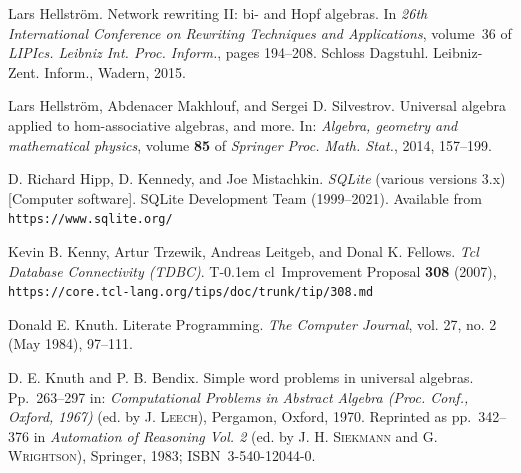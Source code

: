 \documentclass{article}
\theoremstyle{definition}
\newcommand{\Tcl}{T\kern-0.1em cl}
\providecommand{\url}[1]{\texttt{#1}}
\begin{document}
\begin{thebibliography}{99}
   Lars Hellstr\"{o}m.
   \newblock Network rewriting {II}: bi- and {H}opf algebras.
   \newblock In {\em 26th {I}nternational {C}onference on {R}ewriting {T}echniques
     and {A}pplications}, volume~36 of {\em LIPIcs. Leibniz Int. Proc. Inform.},
     pages 194--208. Schloss Dagstuhl. Leibniz-Zent. Inform., Wadern, 2015.

  Lars Hellstr\"om, Abdenacer Makhlouf, and Sergei D. Silvestrov.
  Universal algebra applied to hom-associative algebras, and more.
  In: \textit{Algebra, geometry and mathematical physics}, 
  volume \textbf{85} of \textit{Springer Proc. Math. Stat.}, 
  2014, 157--199.

  D. Richard Hipp, D. Kennedy, and Joe Mistachkin.
  \textit{SQLite} (various versions 3.x) [Computer software]. 
  SQLite Development Team (1999--2021).
  Available from \url{https://www.sqlite.org/}

  Kevin B. Kenny, Artur Trzewik, Andreas Leitgeb, and Donal K. 
  Fellows.
  \textit{Tcl Database Connectivity (TDBC)}.
  \Tcl\ Improvement Proposal \textbf{308} (2007),
  \url{https://core.tcl-lang.org/tips/doc/trunk/tip/308.md}

  Donald E. Knuth. 
  Literate Programming.
  \textit{The Computer Journal}, vol. 27, no. 2 (May 1984), 97--111.

   D. E. Knuth and P. B. Bendix.
   Simple word problems in universal algebras.
   Pp.~263--297 in: 
   \textit{Computational Problems in Abstract Algebra 
     (Proc. Conf., Oxford, 1967)} (ed. by \textsc{J. Leech}),
   Pergamon, Oxford, 1970.
   Reprinted as pp.~342--376 in \textit{Automation of Reasoning Vol. 2} 
   (ed. by \textsc{J. H. Siekmann} and \textsc{G. Wrightson}), 
   Springer, 1983; 
   ISBN~3-540-12044-0.



\end{thebibliography}
\end{document}
